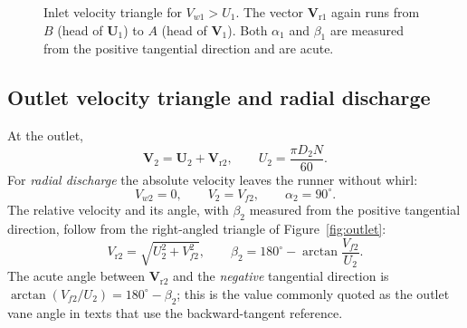 \documentclass[11pt,a4paper]{article}
\numberwithin{equation}{section}
\newcommand{\vr}{\mathrm{r}}
\newcommand{\vvec}[1]{\bm{#1}}
\begin{document}
\begin{figure}[h!]
\centering
{}
\caption{Inlet velocity triangle for $V_{w1} > U_1$. The vector $\bm V_{\mathrm r1}$ again runs from $B$ (head of $\bm U_1$) to $A$ (head of $\bm V_1$). Both $\alpha_1$ and $\beta_1$ are measured from the positive tangential direction and are acute.}
\label{fig:inlet-b}
\end{figure}

\subsection{Outlet velocity triangle and radial discharge}
\label{sec:outlet}

At the outlet,
\begin{equation}
  \vvec{V}_2 = \vvec{U}_2 + \vvec{V}_{\vr 2}, \qquad U_2 = \frac{\pi D_2 N}{60}.
  \label{eq:outlet-vec}
\end{equation}
For \emph{radial discharge} the absolute velocity leaves the runner without whirl:
\begin{equation}
  V_{w2} = 0, \qquad V_2 = V_{f2}, \qquad \alpha_2 = 90^\circ .
  \label{eq:radial}
\end{equation}
The relative velocity and its angle, with $\beta_2$ measured from the positive tangential direction, follow from the right-angled triangle of Figure~\ref{fig:outlet}:
\begin{equation}
  V_{\vr 2} = \sqrt{U_2^{2} + V_{f2}^{2}}, \qquad
  \beta_2 = 180^\circ - \arctan\frac{V_{f2}}{U_2}.
  \label{eq:outlet-rel}
\end{equation}
The acute angle between $\vvec{V}_{\vr 2}$ and the \emph{negative} tangential direction is $\arctan(V_{f2}/U_2) = 180^\circ-\beta_2$; this is the value commonly quoted as the outlet vane angle in texts that use the backward-tangent reference.
\end{document}
